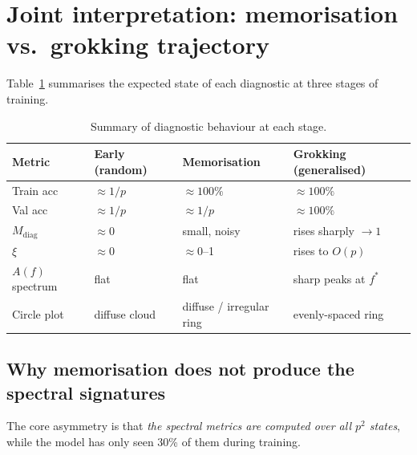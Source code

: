 \documentclass[11pt]{article}
\newcommand{\diag}{\mathrm{diag}}
\begin{document}
\section{Joint interpretation: memorisation vs.\ grokking trajectory}
\label{sec:joint}

Table~\ref{tab:summary} summarises the expected state of each diagnostic
at three stages of training.

\begin{table}[h]
\centering
\begin{tabular}{lp{3.2cm}p{3.2cm}p{3.8cm}}
\toprule
Metric & Early (random) & Memorisation & Grokking (generalised) \\
\midrule
Train acc & $\approx 1/p$ & $\approx 100\%$ & $\approx 100\%$ \\
Val acc   & $\approx 1/p$ & $\approx 1/p$  & $\approx 100\%$ \\
$M_{\diag}$ & $\approx 0$ & small, noisy & rises sharply $\to 1$ \\
$\xi$       & $\approx 0$ & $\approx 0$--1 & rises to $O(p)$ \\
$A(f)$ spectrum & flat & flat & sharp peaks at $f^*$ \\
Circle plot & diffuse cloud & diffuse / irregular ring & evenly-spaced ring \\
\bottomrule
\end{tabular}
\caption{Summary of diagnostic behaviour at each stage.}
\label{tab:summary}
\end{table}

\subsection{Why memorisation does not produce the spectral signatures}

The core asymmetry is that \emph{the spectral metrics are computed over all
$p^2$ states}, while the model has only seen 30\% of them during training.
\end{document}
